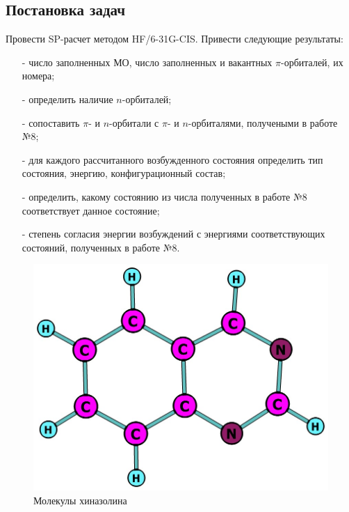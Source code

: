 \subsection{Постановка задач}
Провести SP-расчет методом HF/6-31G-CIS. Привести следующие результаты:
\begin{itemize}
    \item[-] число заполненных МО, число заполненных и вакантных $\pi$-орбиталей, их номера;
    \item[-] определить наличие $n$-орбиталей;
    \item[-] сопоставить $\pi$- и $n$-орбитали с $\pi$- и $n$-орбиталями, получеными в работе №8;
    \item[-] для каждого рассчитанного возбужденного состояния определить тип состояния, энергию, конфигурационный состав;
    \item[-] определить, какому состоянию из числа полученных в работе №8 соответствует данное состояние;
    \item[-] степень согласия энергии возбуждений с энергиями соответствующих состояний, полученных в работе №8.  
\end{itemize}

\begin{figure}[H]
\centering
\captionsetup{justification=centering}
\includegraphics[scale=0.4]{fig/1.jpg}
\caption{Молекулы хиназолина}
\end{figure}
